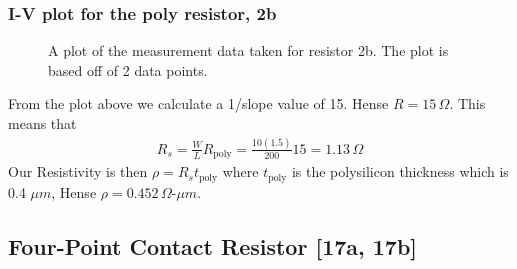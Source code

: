\documentclass{article}
\begin{document}
\subsubsection{I-V plot for the poly resistor, 2b}
\begin{figure}[H]
\centering
{}
\caption{A plot of the measurement data taken for resistor 2b. The plot is based off of 2 data points.}
\end{figure}

From the plot above we calculate a 1/slope value of 15. Hense $R = 15 \,\Omega$. This means that 
\begin{align*}
R_s = \frac{W}{L}R_{\text{poly}} = \frac{10(1.5)}{200}15 = 1.13 \,\Omega 
\end{align*}
Our Resistivity is then $\rho = R_s t_{\text{poly}}$ where $t_{\text{poly}}$ is the polysilicon thickness which is 0.4 $\mu m$, Hense $\rho = 0.452 \,\Omega$-$\mu m$.

\subsection{Four-Point Contact Resistor [17a, 17b]} %
\end{document}
